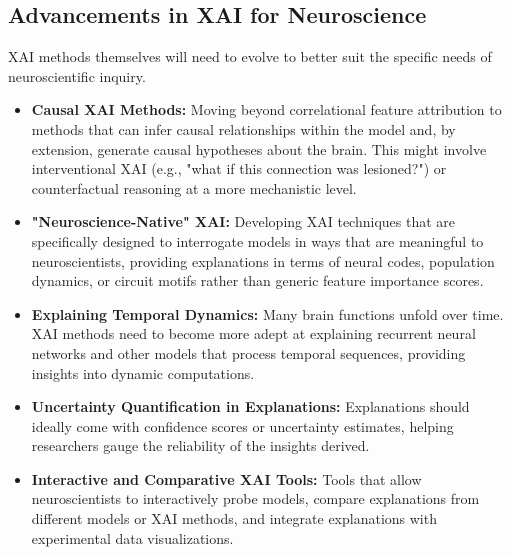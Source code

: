\documentclass[11pt,a4paper]{article}
\begin{document}
\subsection{Advancements in XAI for Neuroscience}
XAI methods themselves will need to evolve to better suit the specific needs of neuroscientific inquiry.
\begin{itemize}
    \item \textbf{Causal XAI Methods:} Moving beyond correlational feature attribution to methods that can infer causal relationships within the model and, by extension, generate causal hypotheses about the brain. This might involve interventional XAI (e.g., "what if this connection was lesioned?") or counterfactual reasoning at a more mechanistic level.
    \item \textbf{"Neuroscience-Native" XAI:} Developing XAI techniques that are specifically designed to interrogate models in ways that are meaningful to neuroscientists, providing explanations in terms of neural codes, population dynamics, or circuit motifs rather than generic feature importance scores.
    \item \textbf{Explaining Temporal Dynamics:} Many brain functions unfold over time. XAI methods need to become more adept at explaining recurrent neural networks and other models that process temporal sequences, providing insights into dynamic computations.
    \item \textbf{Uncertainty Quantification in Explanations:} Explanations should ideally come with confidence scores or uncertainty estimates, helping researchers gauge the reliability of the insights derived.
    \item \textbf{Interactive and Comparative XAI Tools:} Tools that allow neuroscientists to interactively probe models, compare explanations from different models or XAI methods, and integrate explanations with experimental data visualizations.
\end{itemize}
\end{document}
